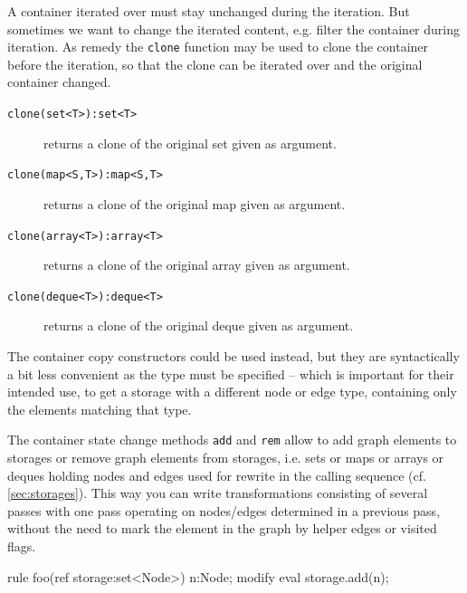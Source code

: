


A container iterated over must stay unchanged during the iteration.
But sometimes we want to change the iterated content, e.g. filter the container during iteration.
As remedy the \texttt{clone} function may be used to clone the container before the iteration, so that the clone can be iterated over and the original container changed.

\begin{description}
\item[\texttt{clone(set<T>):set<T>}] returns a clone of the original set given as argument.
\item[\texttt{clone(map<S,T>):map<S,T>}] returns a clone of the original map given as argument.
\item[\texttt{clone(array<T>):array<T>}] returns a clone of the original array given as argument.
\item[\texttt{clone(deque<T>):deque<T>}] returns a clone of the original deque given as argument.
\end{description}

The container copy constructors could be used instead, but they are syntactically a bit less convenient as the type must be specified
 -- which is important for their intended use, to get a storage with a different node or edge type, containing only the elements matching that type.

\begin{example}
The container state change methods \texttt{add} and \texttt{rem} allow to add graph elements to storages or remove graph elements from storages, i.e. sets or maps or arrays or deques holding nodes and edges used for rewrite in the calling sequence (cf. \ref{sec:storages}).
This way you can write transformations consisting of several passes with one pass operating on nodes/edges determined in a previous pass,
without the need to mark the element in the graph by helper edges or visited flags.
	\begin{grgen}
rule foo(ref storage:set<Node>)
{
  n:Node;
  modify {
    eval {
      storage.add(n);
    }
  }
}
	\end{grgen}
\end{example}

